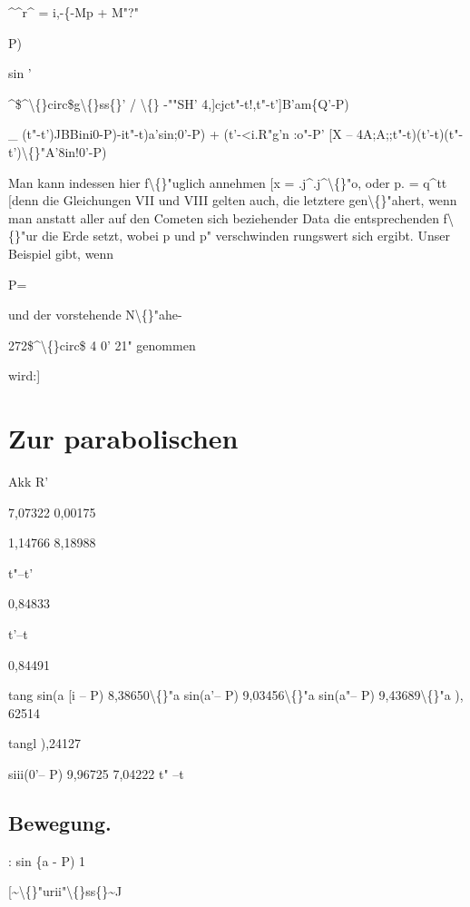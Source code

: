 \documentclass[10pt,a4paper]{article}
\begin{document}
\textasciicircum{}\textasciicircum{}r\textasciicircum{} = i,-\{-Mp + M"?"

P)

sin '

\textasciicircum{}\$\textasciicircum{}\textbackslash\{\}circ\$g\textbackslash\{\}ss\{\}' /
\textbackslash\{\} -""SH'
4,]cjct"-t!,t"-t']B'am\{Q'-P)

\_
(t"-t')JBBini0-P)-it"-t)a'sin;0'-P) + (t'-<i.R"g'n :o"-P'
[X --
4A;A;;t"-t)(t'-t)(t"-t')\textbackslash\{\}"A'8in!0'-P)

Man kann indessen hier f\textbackslash\{\}"uglich annehmen [x = .j\textasciicircum{}.j\textasciicircum{}\textbackslash\{\}"o, oder p. = q\textasciicircum{}tt
[denn die Gleichungen VII und VIII gelten auch, die letztere gen\textbackslash\{\}"ahert, wenn
man anstatt aller auf den Cometen sich beziehender Data die entsprechenden
f\textbackslash\{\}"ur die Erde setzt, wobei p und p" verschwinden
rungswert sich ergibt.
Unser Beispiel gibt, wenn

P=

und der vorstehende N\textbackslash\{\}"ahe-

272\$\textasciicircum{}\textbackslash\{\}circ\$ 4 0' 21" genommen

wird:]

\newpage
\section*{Zur parabolischen}

Akk
R'

7,07322
0,00175

1,14766
8,18988

t"--t'

0,84833

t'--t

0,84491


tang
sin(a [i
-- P) 8,38650\textbackslash\{\}"a sin(a'-- P) 9,03456\textbackslash\{\}"a sin(a"-- P) 9,43689\textbackslash\{\}"a
), 62514

tangl
),24127

siii(0'-- P) 9,96725
7,04222
t" --t

\subsection*{Bewegung.}

: sin \{a - P) 1

[\textasciitilde{}\textbackslash\{\}"urii"\textbackslash\{\}ss\{\}\textasciitilde{}J
\end{document}
